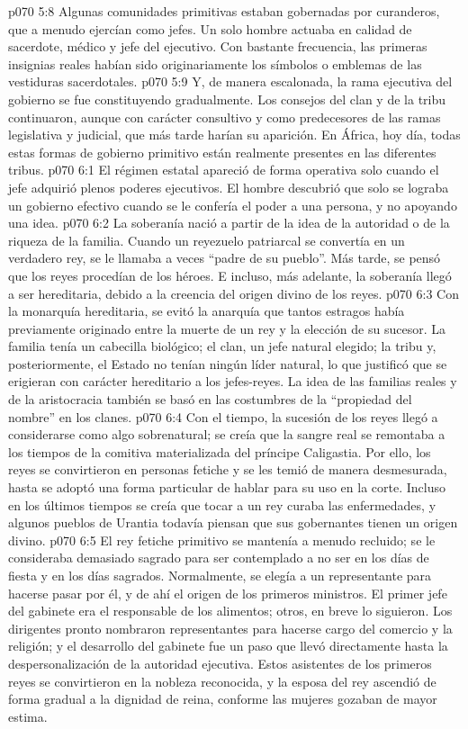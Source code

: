 \vs p070 5:8 Algunas comunidades primitivas estaban gobernadas por curanderos, que a menudo ejercían como jefes. Un solo hombre actuaba en calidad de sacerdote, médico y jefe del ejecutivo. Con bastante frecuencia, las primeras insignias reales habían sido originariamente los símbolos o emblemas de las vestiduras sacerdotales.
\vs p070 5:9 Y, de manera escalonada, la rama ejecutiva del gobierno se fue constituyendo gradualmente. Los consejos del clan y de la tribu continuaron, aunque con carácter consultivo y como predecesores de las ramas legislativa y judicial, que más tarde harían su aparición. En África, hoy día, todas estas formas de gobierno primitivo están realmente presentes en las diferentes tribus.
\vs p070 6:1 El régimen estatal apareció de forma operativa solo cuando el jefe adquirió plenos poderes ejecutivos. El hombre descubrió que solo se lograba un gobierno efectivo cuando se le confería el poder a una persona, y no apoyando una idea.
\vs p070 6:2 La soberanía nació a partir de la idea de la autoridad o de la riqueza de la familia. Cuando un reyezuelo patriarcal se convertía en un verdadero rey, se le llamaba a veces “padre de su pueblo”. Más tarde, se pensó que los reyes procedían de los héroes. E incluso, más adelante, la soberanía llegó a ser hereditaria, debido a la creencia del origen divino de los reyes.
\vs p070 6:3 Con la monarquía hereditaria, se evitó la anarquía que tantos estragos había previamente originado entre la muerte de un rey y la elección de su sucesor. La familia tenía un cabecilla biológico; el clan, un jefe natural elegido; la tribu y, posteriormente, el Estado no tenían ningún líder natural, lo que justificó que se erigieran con carácter hereditario a los jefes\hyp{}reyes. La idea de las familias reales y de la aristocracia también se basó en las costumbres de la “propiedad del nombre” en los clanes.
\vs p070 6:4 Con el tiempo, la sucesión de los reyes llegó a considerarse como algo sobrenatural; se creía que la sangre real se remontaba a los tiempos de la comitiva materializada del príncipe Caligastia. Por ello, los reyes se convirtieron en personas fetiche y se les temió de manera desmesurada, hasta se adoptó una forma particular de hablar para su uso en la corte. Incluso en los últimos tiempos se creía que tocar a un rey curaba las enfermedades, y algunos pueblos de Urantia todavía piensan que sus gobernantes tienen un origen divino.
\vs p070 6:5 El rey fetiche primitivo se mantenía a menudo recluido; se le consideraba demasiado sagrado para ser contemplado a no ser en los días de fiesta y en los días sagrados. Normalmente, se elegía a un representante para hacerse pasar por él, y de ahí el origen de los primeros ministros. El primer jefe del gabinete era el responsable de los alimentos; otros, en breve lo siguieron. Los dirigentes pronto nombraron representantes para hacerse cargo del comercio y la religión; y el desarrollo del gabinete fue un paso que llevó directamente hasta la despersonalización de la autoridad ejecutiva. Estos asistentes de los primeros reyes se convirtieron en la nobleza reconocida, y la esposa del rey ascendió de forma gradual a la dignidad de reina, conforme las mujeres gozaban de mayor estima.
